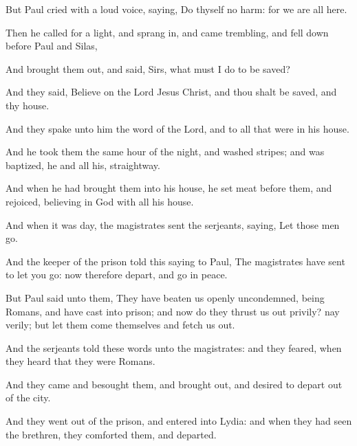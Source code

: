 {But
Paul
cried with a
loud
voice,
saying,
Do
thyself
no
harm:
for we
are
all
here.

Then he
called for a
light, and sprang
in,
and
came
trembling, and fell
down before
Paul
and
Silas,

And
brought
them
out, and
said,
Sirs,
what
must
I
do to
be
saved?

And they
said,
Believe
on the
Lord
Jesus
Christ,
and
thou shalt be
saved,
and
thy
house.

And they
spake unto
him the
word of the
Lord,
and to
all that
were
in
his
house.

And he
took
them the
same
hour of the
night, and
washed
{}
stripes;
and was
baptized,
he
and
all
his,
straightway.

And when he had
brought
them
into
his
house, he
set
meat before
them,
and
rejoiced,
believing in
God with all his
house.

And
when it was
day, the
magistrates
sent the
serjeants,
saying,
Let
those
men
go.

And the keeper of the
prison
told
this
saying
to
Paul, The
magistrates have
sent
to let you
go:
now
therefore
depart, and
go
in
peace.

But
Paul
said
unto
them, They have
beaten
us
openly
uncondemned,
being
Romans, and have
cast
{}
into
prison;
and
now do they
thrust
us
out
privily?
nay
verily;
but let them
come
themselves and
fetch
us
out.

And the
serjeants
told
these
words unto the
magistrates:
and they
feared, when they
heard
that they
were
Romans.

And they
came and
besought
them,
and
brought
{}
out, and
desired
{} to
depart out of the
city.

And they
went out
of the
prison, and
entered
into
{}
Lydia:
and when they had
seen the
brethren, they
comforted
them,
and
departed.




\par }
